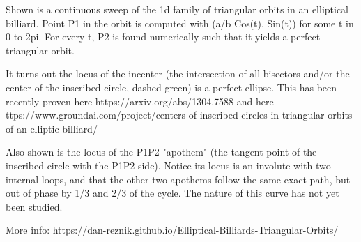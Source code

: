 Shown is a continuous sweep of the 1d family of triangular orbits in an elliptical billiard. Point P1 in the orbit is computed with (a/b Cos(t), Sin(t)) for some t in 0 to 2pi. For every t, P2 is found numerically such that it yields a perfect triangular orbit.

It turns out the locus of the incenter (the intersection of all bisectors and/or the center of the inscribed circle, dashed green) is a perfect ellipse. This has been recently proven here https://arxiv.org/abs/1304.7588 and here ttps://www.groundai.com/project/centers-of-inscribed-circles-in-triangular-orbits-of-an-elliptic-billiard/

Also shown is the locus of the P1P2 "apothem" (the tangent point of the inscribed circle with the P1P2 side). Notice its locus is an involute with two internal loops, and that the other two apothems follow the same exact path, but out of phase by 1/3 and 2/3 of the cycle. The nature of this curve has not yet been studied.

More info: https://dan-reznik.github.io/Elliptical-Billiards-Triangular-Orbits/